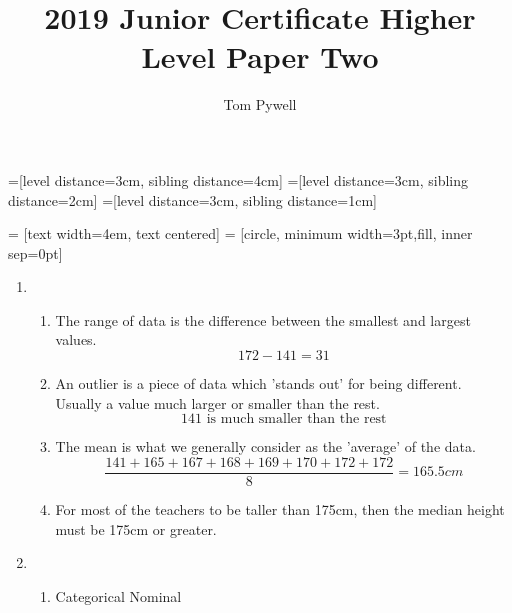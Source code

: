\documentclass[11pt]{article}
\begin{document}
=[level distance=3cm, sibling distance=4cm]
=[level distance=3cm, sibling distance=2cm]
=[level distance=3cm, sibling distance=1cm]


 = [text width=4em, text centered]
 = [circle, minimum width=3pt,fill, inner sep=0pt]

\author{Tom Pywell}
\title{2019 Junior Certificate Higher Level Paper Two}
\maketitle

\medskip

\begin{enumerate}
    \pagebreak
    \item
        \begin{enumerate}
            \item The range of data is the difference between the smallest and largest values.
                \begin{equation*}
                    172-141=31
                \end{equation*}
            \item
                An outlier is a piece of data which 'stands out' for being different.
                Usually a value much larger or smaller than the rest.
                \begin{equation*}
                    141\text{ is much smaller than the rest}
                \end{equation*}
            \item
                The mean is what we generally consider as the 'average' of the data.
                \begin{equation*}
                    \frac{141+165+167+168+169+170+172+172}{8}=165.5cm
                \end{equation*}
            \item
                For most of the teachers to be taller than 175cm, then the median height must be 175cm or greater.
        \end{enumerate}
    
    \pagebreak
    \item
        \begin{enumerate}
            \item Categorical Nominal\\
                

\end{enumerate}
\end{enumerate}
\end{document}
